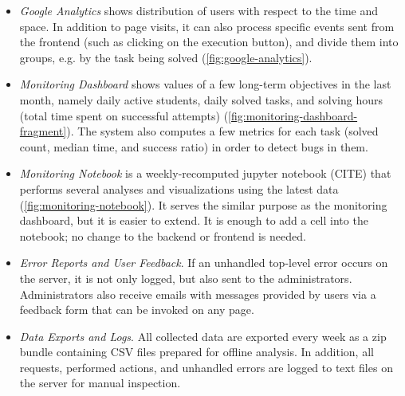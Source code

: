 \begin{itemize}
\item \emph{Google Analytics}
  shows distribution of users with respect to the time and space.
  In addition to page visits,
  it can also process specific events sent from the frontend
  (such as clicking on the execution button),
  and divide them into groups, e.g. by the task being solved
  (\cref{fig:google-analytics}).
\item \emph{Monitoring Dashboard}
  shows values of a few long-term objectives %
  in the last month, namely daily active students, daily solved tasks, and
  solving hours (total time spent on successful attempts)
  (\cref{fig:monitoring-dashboard-fragment}).
  The system also computes a few metrics for each task
  (solved count, median time, and success ratio) in order to detect
  bugs in them.
\item \emph{Monitoring Notebook}
  is a weekly-recomputed jupyter notebook (CITE) that performs several analyses
  and visualizations using the latest data (\cref{fig:monitoring-notebook}).
  It serves the similar purpose as the monitoring dashboard, but it is
  easier to extend. It is enough to add a cell into the notebook;
  no change to the backend or frontend is needed.
\item \emph{Error Reports and User Feedback}.
  If an unhandled top-level error occurs on the server,
  it is not only logged, but also sent to the administrators.
  Administrators also receive emails with messages provided by users via
  a feedback form that can be invoked on any page.
\item \emph{Data Exports and Logs}.
  All collected data are exported every week as a zip bundle containing
  CSV files prepared for %
  offline analysis.
  In addition, all requests, performed actions, and unhandled errors %
  are logged to text files on the server for manual inspection.
\end{itemize}



